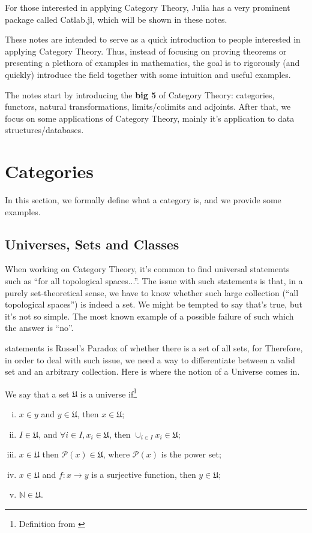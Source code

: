 For those interested in applying Category Theory, Julia has a very
prominent package called Catlab.jl, which will be shown in these notes.

These notes are intended to serve as a quick introduction to people interested
in applying Category Theory. Thus, instead of focusing on proving theorems
or presenting a plethora of examples in mathematics, the goal is to rigorously
(and quickly) introduce the field together with some intuition and useful examples.

The notes start by introducing the \textbf{big 5} of Category Theory:
categories, functors, natural transformations, limits/colimits and adjoints.
After that, we focus on some applications of Category Theory,
mainly it's application to data structures/databases.

\newpage
\section{Categories}

In this section, we formally define what a category is, and we provide
some examples.

\subsection{Universes, Sets and Classes}

When working on Category Theory, it's common to find universal
statements such as ``for all topological spaces...''. The issue
with such statements is that, in a purely set-theoretical sense,
we have to know whether such large collection (``all topological spaces'')
is indeed a set. We might be tempted to say that's true, but
it's not so simple. The most known example of a possible failure of such
which the answer is ``no''.

statements is Russel's Paradox of whether there is a set of all sets, for
Therefore, in order to deal with such issue, we need a way to differentiate
between a valid set and an arbitrary collection. Here is where the notion of a Universe comes in.

\begin{definition}[Universe]
  We say that a set $\mathfrak U$ is a universe if\footnote{Definition from \citet{borceux1994handbook}}
  \begin{enumerate}[(i)]
    \item $x\in y$ and $ y\in \mathfrak U$, then $x \in \mathfrak U$;
    \item $I \in \mathfrak U$, and $\forall i \in I, x_i \in \mathfrak U$, then $\cup_{i\in I}x_i \in \mathfrak U$;
    \item $x \in \mathfrak U$ then $\mathcal P(x) \in \mathfrak U$, where $\mathcal P(x)$ is the power set;
    \item $x \in \mathfrak U$ and $f:x\to y$ is a surjective function, then $y \in \mathfrak U$;
    \item $\mathbb N \in \mathfrak U$.
  \end{enumerate}
\end{definition}

